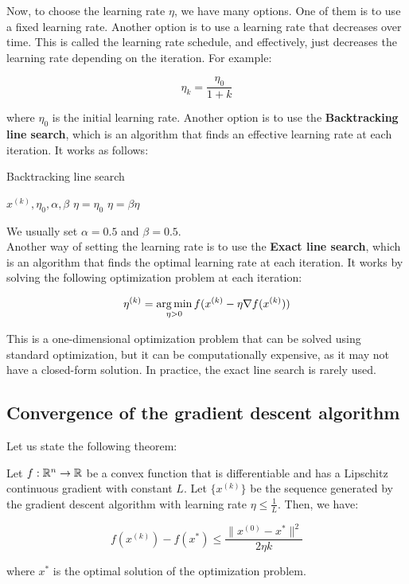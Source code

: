 Now, to choose the learning rate $\eta$, we have many options. One of them is to
use a fixed learning rate. Another option is to use a learning rate that decreases
over time. This is called the learning rate schedule, and effectively, just decreases
the learning rate depending on the iteration. For example:

\begin{equation}
    \eta_k = \frac{\eta_0}{1 + k}
\end{equation}

where $\eta_0$ is the initial learning rate. Another option is to use the \textbf{Backtracking
line search}, which is an algorithm that finds an effective learning rate at each iteration. It
works as follows:

\begin{algorithm}[H]
    \caption{Backtracking line search}
    \begin{algorithmic}[1]
        \Require $x^{(k)}, \eta_0, \alpha, \beta$
        \State $\eta = \eta_0$
            \State $\eta = \beta \eta$
        \EndWhile
    \end{algorithmic}
\end{algorithm}

We usually set $\alpha = 0.5$ and $\beta = 0.5$.\\

Another way of setting the learning rate is to use the \textbf{Exact line search}, which
is an algorithm that finds the optimal learning rate at each iteration. It works by solving
the following optimization problem at each iteration:

\begin{equation}
    \eta^{(k)} = \operatorname*{arg\,min}_{\eta > 0} f(x^{(k)} - \eta \nabla f(x^{(k)}))
\end{equation}

This is a one-dimensional optimization problem that can be solved using standard optimization,
but it can be computationally expensive, as it may not have a closed-form solution. In practice,
the exact line search is rarely used.

\subsection{Convergence of the gradient descent algorithm}

Let us state the following theorem:

\begin{theorem}
    Let $f: \mathbb{R}^n \rightarrow \mathbb{R}$ be a convex function that is differentiable and has a Lipschitz
    continuous gradient with constant $L$. Let $\{ x^{(k)} \}$ be the sequence generated by the
    gradient descent algorithm with learning rate $\eta \leq \frac{1}{L}$. Then, we have:

    \begin{equation}
        f(x^{(k)}) - f(x^*) \leq \frac{\| x^{(0)} - x^* \|^2}{2 \eta k}
    \end{equation}

    where $x^*$ is the optimal solution of the optimization problem.
\end{theorem}

